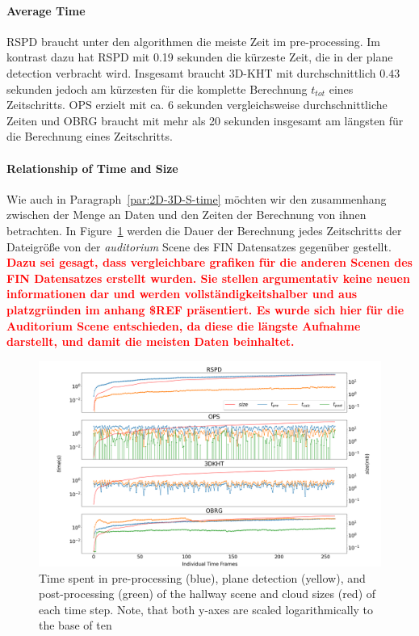 \documentclass[main.tex]{subfiles}
\begin{document}
\paragraph{Average Time}
RSPD braucht unter den algorithmen die meiste Zeit im pre-processing. Im kontrast dazu hat RSPD mit 0.19 sekunden
die kürzeste Zeit, die in der plane detection verbracht wird. Insgesamt braucht 3D-KHT mit durchschnittlich $0.43$
sekunden jedoch am kürzesten für die komplette Berechnung $t_{tot}$ eines Zeitschritts. OPS erzielt mit ca. 6 sekunden vergleichsweise
durchschnittliche Zeiten und OBRG braucht mit mehr als 20 sekunden insgesamt am längsten für die Berechnung
eines Zeitschritts.

\paragraph{Relationship of Time and Size}
Wie auch in Paragraph~\ref{par:2D-3D-S-time} möchten wir den zusammenhang zwischen der Menge an Daten und den Zeiten
der Berechnung von ihnen betrachten.
In Figure~\ref{fig:dynaudi} werden die Dauer der Berechnung jedes Zeitschritts der Dateigröße von der
\textit{auditorium} Scene des FIN Datensatzes gegenüber gestellt. \textbf{\textcolor{red}{Dazu sei gesagt, dass vergleichbare grafiken
für die anderen Scenen des FIN Datensatzes erstellt wurden. Sie stellen argumentativ keine neuen informationen dar und werden 
vollständigkeitshalber und aus platzgründen im anhang \$REF präsentiert. Es wurde sich hier für die Auditorium Scene
entschieden, da diese die längste Aufnahme darstellt, und damit die meisten Daten beinhaltet.}}

\begin{figure}[H]
    \centering
    \includegraphics[width=\textwidth]{images/dyn_time-audi.png}
    \caption[Time Results Hallway]{Time spent in pre-processing (blue), plane detection (yellow), and post-processing
        (green) of the hallway scene and cloud sizes (red) of each time step. Note, that both y-axes are scaled 
        logarithmically to the base of ten}
    \label{fig:dynaudi}
\end{figure}
\end{document}
